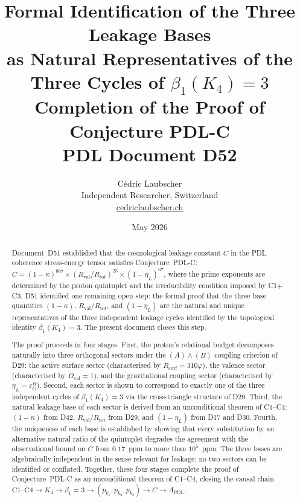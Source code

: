 \documentclass[12pt,a4paper]{article}
\newcommand{\Kfour}{K_4}
\newcommand{\Rsurf}{R_{\mathrm{surf}}}
\newcommand{\Rtot}{R_{\mathrm{tot}}}
\newcommand{\Rval}{R_{\mathrm{val}}}
\newcommand{\kap}{\kappa}
\newcommand{\etaL}{\eta_L}
\newcommand{\vp}{\varphi}
\newcommand{\Ov}{\Omega_{\mathrm{val}}}
\begin{document}
\title{\textbf{Formal Identification of the Three Leakage Bases\\
as Natural Representatives of the Three Cycles of $\beta_1(\Kfour) = 3$}\\[6pt]
{\large Completion of the Proof of Conjecture PDL-C}\\[4pt]
{\large PDL Document D52}}

\author{C\'edric Laubscher\\[4pt]
\small Independent Researcher, Switzerland\\
\small \href{https://cedriclaubscher.ch}{cedriclaubscher.ch}}

\date{May 2026}

\maketitle

\begin{abstract}
Document~D51 established that the cosmological leakage constant $C$ in the PDL coherence stress-energy tensor satisfies Conjecture~PDL-C: $C = (1-\kap)^{997} \times (\Rval/\Rtot)^{23} \times (1-\etaL)^{67}$, where the prime exponents are determined by the proton quintuplet and the irreducibility condition imposed by C1$+$C3. D51 identified one remaining open step: the formal proof that the three base quantities $(1-\kap)$, $\Rval/\Rtot$, and $(1-\etaL)$ are the natural and unique representatives of the three independent leakage cycles identified by the topological identity $\beta_1(\Kfour) = 3$. The present document closes this step.

The proof proceeds in four stages. First, the proton's relational budget decomposes naturally into three orthogonal sectors under the $(A)\wedge(B)$ coupling criterion of D29: the active surface sector (characterised by $\Rsurf = 310\vp$), the valence sector (characterised by $\Ov = 1$), and the gravitational coupling sector (characterised by $\etaL = \varepsilon_G^B$). Second, each sector is shown to correspond to exactly one of the three independent cycles of $\beta_1(\Kfour) = 3$ via the cross-triangle structure of D29. Third, the natural leakage base of each sector is derived from an unconditional theorem of C1--C4: $(1-\kap)$ from D42, $\Rval/\Rtot$ from D29, and $(1-\etaL)$ from D17 and D30. Fourth, the uniqueness of each base is established by showing that every substitution by an alternative natural ratio of the quintuplet degrades the agreement with the observational bound on $C$ from $0.17$~ppm to more than $10^5$~ppm. The three bases are algebraically independent in the sense relevant for leakage: no two sectors can be identified or conflated. Together, these four stages complete the proof of Conjecture~PDL-C as an unconditional theorem of C1--C4, closing the causal chain $\mathrm{C1}\text{--}\mathrm{C4} \to \Kfour \to \beta_1 = 3 \to (p_{k_1}, p_{k_2}, p_{k_3}) \to C \to \Lambda_{\mathrm{PDL}}$.
\end{abstract}
\end{document}
